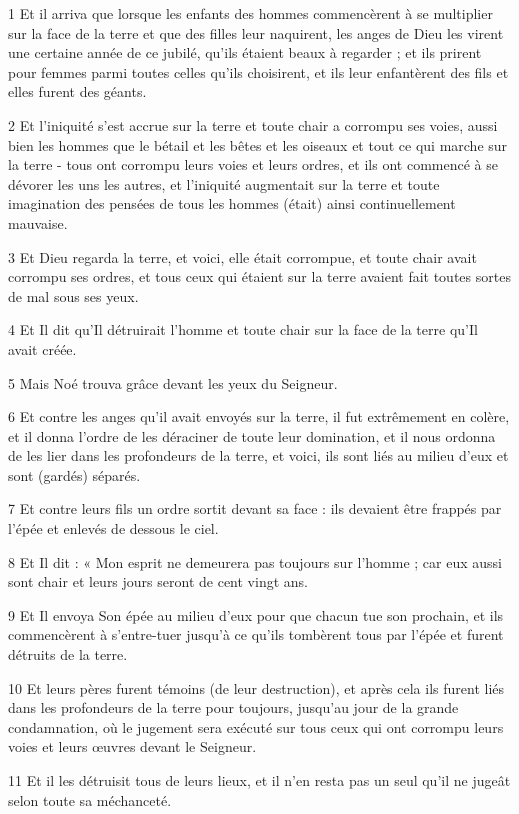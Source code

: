 \par 1 Et il arriva que lorsque les enfants des hommes commencèrent à se multiplier sur la face de la terre et que des filles leur naquirent, les anges de Dieu les virent une certaine année de ce jubilé, qu'ils étaient beaux à regarder ; et ils prirent pour femmes parmi toutes celles qu'ils choisirent, et ils leur enfantèrent des fils et elles furent des géants.
\par 2 Et l'iniquité s'est accrue sur la terre et toute chair a corrompu ses voies, aussi bien les hommes que le bétail et les bêtes et les oiseaux et tout ce qui marche sur la terre - tous ont corrompu leurs voies et leurs ordres, et ils ont commencé à se dévorer les uns les autres, et l'iniquité augmentait sur la terre et toute imagination des pensées de tous les hommes (était) ainsi continuellement mauvaise.
\par 3 Et Dieu regarda la terre, et voici, elle était corrompue, et toute chair avait corrompu ses ordres, et tous ceux qui étaient sur la terre avaient fait toutes sortes de mal sous ses yeux.
\par 4 Et Il dit qu'Il détruirait l'homme et toute chair sur la face de la terre qu'Il avait créée.
\par 5 Mais Noé trouva grâce devant les yeux du Seigneur.
\par 6 Et contre les anges qu'il avait envoyés sur la terre, il fut extrêmement en colère, et il donna l'ordre de les déraciner de toute leur domination, et il nous ordonna de les lier dans les profondeurs de la terre, et voici, ils sont liés au milieu d'eux et sont (gardés) séparés.
\par 7 Et contre leurs fils un ordre sortit devant sa face : ils devaient être frappés par l'épée et enlevés de dessous le ciel.
\par 8 Et Il dit : « Mon esprit ne demeurera pas toujours sur l'homme ; car eux aussi sont chair et leurs jours seront de cent vingt ans.
\par 9 Et Il envoya Son épée au milieu d'eux pour que chacun tue son prochain, et ils commencèrent à s'entre-tuer jusqu'à ce qu'ils tombèrent tous par l'épée et furent détruits de la terre.
\par 10 Et leurs pères furent témoins (de leur destruction), et après cela ils furent liés dans les profondeurs de la terre pour toujours, jusqu'au jour de la grande condamnation, où le jugement sera exécuté sur tous ceux qui ont corrompu leurs voies et leurs œuvres devant le Seigneur.
\par 11 Et il les détruisit tous de leurs lieux, et il n'en resta pas un seul qu'il ne jugeât selon toute sa méchanceté.
